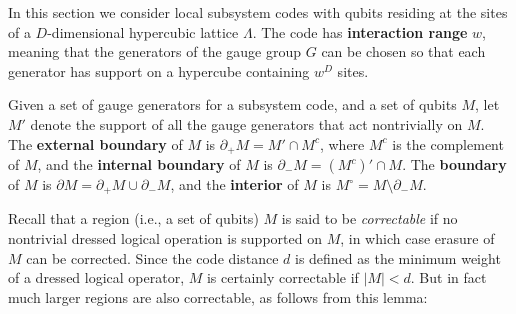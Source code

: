 In this section we consider local subsystem codes 
with qubits residing at the sites of a $D$-dimensional hypercubic lattice $\Lambda$.
The code has {\bf interaction range} $w$, meaning that 
the generators of the gauge group $G$ can be chosen 
so that each generator has support on a hypercube containing $w^D$ sites.

\begin{defn}
\label{defn:boundary}
Given a set of gauge generators for a subsystem code, and a set of qubits $M$, 
let $M'$ denote the support of all the gauge generators that act nontrivially on $M$. 
The {\bf external boundary} of $M$ is $\partial_+ M = M' \cap M^c$, 
where $M^c$ is the complement of $M$, 
and the {\bf internal boundary} of $M$ is  $\partial_- M = \left(M^c\right)' \cap M$.
The {\bf boundary} of $M$ is $\partial M=\partial_+M\cup\partial_-M$,
and the {\bf interior} of $M$ is $M^\circ = M \setminus \partial_- M$.
\end{defn}

Recall that a region (i.e., a set of qubits) $M$ is said to be \emph{correctable}
if no nontrivial dressed logical operation is supported on $M$, 
in which case erasure of $M$ can be corrected. 
Since the code distance $d$ is defined as the minimum weight of a dressed logical operator,
$M$ is certainly correctable if $|M| < d$.
But in fact much larger regions are also correctable, as follows from this lemma: 

